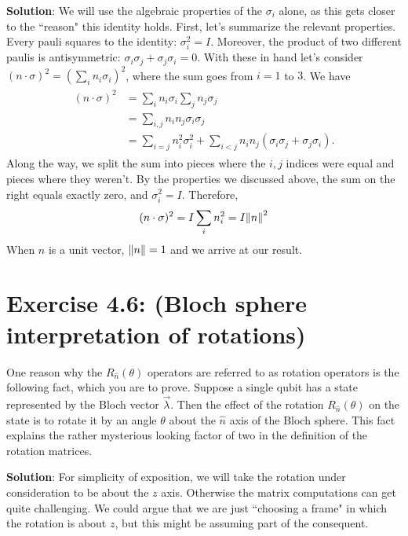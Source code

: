 \documentclass{book}
\begin{document}
    \textbf{Solution}: We will use the algebraic properties of the $\sigma_i$ alone, as this gets closer to the ``reason" this identity holds. First, let's summarize the relevant properties. Every pauli squares to the identity: $\sigma_i^2 = I$. Moreover, the product of two different paulis is antisymmetric: $\sigma_i \sigma_j +\sigma_j \sigma_i = 0$. With these in hand let's consider $(n\cdot \sigma)^2 = (\sum_i n_i \sigma_i)^2$, where the sum goes from $i = 1$ to $3$. We have
    \begin{align}
    \begin{aligned}
        (n\cdot \sigma)^2 &= \sum_i n_i \sigma_i \sum_j n_j  \sigma_j \\
        &= \sum_{i,j} n_i n_j \sigma_i \sigma_j \\
        &= \sum_{i = j} n_i^2 \sigma_i^2 + \sum_{i<j} n_i n_j (\sigma_i \sigma_j + \sigma_j \sigma_i).
    \end{aligned}
    \end{align}
    Along the way, we split the sum into pieces where the $i,j$ indices were equal and pieces where they weren't. By the properties we discussed above, the sum on the right equals exactly zero, and $\sigma_i^2 = I$. Therefore,
    \begin{align}
        (n\cdot \sigma)^2 = I \sum_i n_i^2 = I \norm{n}^2
    \end{align}
    When $n$ is a unit vector, $\norm{n} = 1$ and we arrive at our result.
    
\section*{Exercise 4.6: (Bloch sphere interpretation of rotations)}
    One reason why the $R_{\hat{n}}(\theta)$ operators are referred to as rotation operators is the following fact, which you are to prove. Suppose a single qubit has a state represented by the Bloch vector $\vec{\lambda}$. Then the effect of the rotation $R_{\hat{n}}(\theta)$ on the state is to rotate it by an angle $\theta$ about the $\hat{n}$ axis of the Bloch sphere. This fact explains the rather mysterious looking factor of two in the definition of the rotation matrices.
    
    \textbf{Solution}: For simplicity of exposition, we will take the rotation under consideration to be about the $z$ axis. Otherwise the matrix computations can get quite challenging. We could argue that we are just ``choosing a frame" in which the rotation is about $z$, but this might be assuming part of the consequent. 
    
\end{document}
